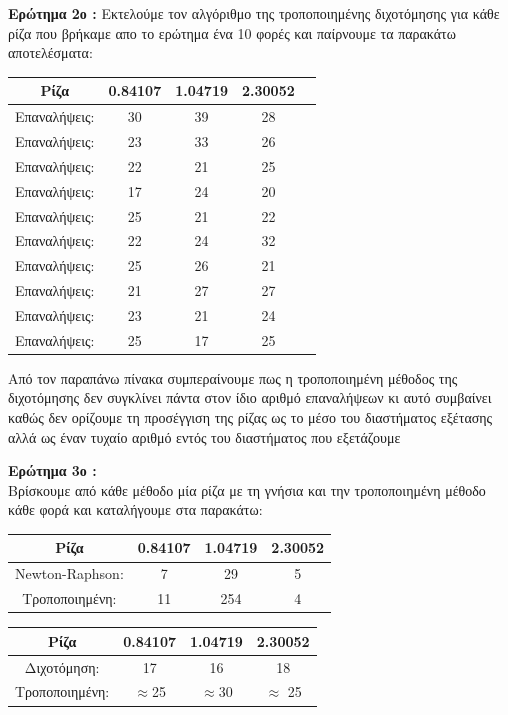 \documentclass{article}
\begin{document}
\par \textbf{\large{Ερώτημα 2ο }:}
Εκτελούμε τον αλγόριθμο της τροποποιημένης διχοτόμησης για κάθε ρίζα που βρήκαμε απο το ερώτημα ένα 10 φορές και παίρνουμε τα παρακάτω αποτελέσματα:
\begin{center}
\begin{tabular}{|c||c|c|c|c|} 
 \hline
 Ρίζα & 0.84107 & 1.04719 & 2.30052 \\ [0.5ex] 
 \hline\hline
 Επαναλήψεις: & 30 & 39 & 28  \\ 
 \hline
 Επαναλήψεις: & 23 & 33 & 26 \\
 \hline
 Επαναλήψεις: & 22 & 21 & 25  \\
 \hline
 Επαναλήψεις: & 17 & 24 & 20 \\
 \hline
 Επαναλήψεις: & 25 & 21 & 22 \\ 
 \hline
 Επαναλήψεις: & 22 & 24 & 32\\
 \hline
 Επαναλήψεις: & 25 & 26 & 21 \\
 \hline
 Επαναλήψεις: & 21 & 27 & 27 \\
 \hline
 Επαναλήψεις: & 23 & 21 & 24 \\
 \hline
 Επαναλήψεις: & 25 & 17 & 25 \\[1ex] 
 \hline
\end{tabular}
\end{center}
Από τον παραπάνω πίνακα συμπεραίνουμε πως η τροποποιημένη μέθοδος της διχοτόμησης δεν συγκλίνει πάντα στον ίδιο αριθμό επαναλήψεων κι αυτό συμβαίνει καθώς δεν ορίζουμε τη προσέγγιση της ρίζας ως το μέσο του διαστήματος εξέτασης αλλά ως έναν τυχαίο αριθμό εντός του διαστήματος που εξετάζουμε\\
\par \textbf{\large{Ερώτημα 3ο }:}\\
Βρίσκουμε από κάθε μέθοδο μία ρίζα με τη γνήσια και την τροποποιημένη μέθοδο κάθε φορά και καταλήγουμε στα παρακάτω:
\begin{center}
\begin{tabular}{|c|c|c|c|} 
 \hline
 Ρίζα & 0.84107 & 1.04719 & 2.30052 \\ [0.5ex] 
 \hline\hline
  Newton-Raphson: & 7 & 29  & 5 \\ 
 \hline
 Τροποποιημένη:  & 11 & 254 & 4  \\[1ex]
 \hline
\end{tabular}
\end{center}
 \begin{center}
\begin{tabular}{|c|c|c|c|} 
 \hline
 Ρίζα & 0.84107 & 1.04719 & 2.30052 \\ [0.5ex] 
 \hline\hline
  Διχοτόμηση: & 17 & 16 & 18\\ 
 \hline
 Τροποποιημένη: & $\approx$25 & $\approx$30 & $\approx$ 25 \\[1ex]
 \hline
 \end{tabular}
 \end{center}
\end{document}
